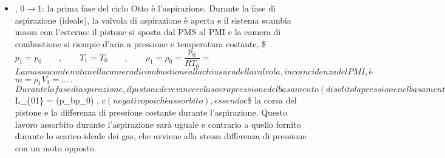 \documentclass[letterpaper,10pt,italian]{jupyterBook}
\begin{document}
\begin{itemize}
\item {} 
\sphinxAtStartPar
{}, \(0 \rightarrow 1\): la prima fase del ciclo Otto è
l’aspirazione. Durante la fase di aspirazione (ideale), la valvola
di aspirazione è aperta e il sistema scambia massa con l’esterno: il
pistone si sposta dal PMS al PMI e la camera di combustione si
riempie d’aria a pressione e temperatura costante,
\$\(p_1 = p_0 \qquad , \qquad
 T_1 = T_0 \qquad , \qquad
 \rho_1 = \rho_0 = \dfrac{p_0}{R T_0} =\)\( La massa contenuta nella
camera di combustione alla chiusura della valvola, in coincidenza
del PMI, è \)\(m = \rho_1 V_1 = \dots \ .\)\( Durante la fase di
aspirazione, il pistone deve vincere la sovrapressione del basamento
(di solito la pressione nel basamento è superiore a quella aspirata
in camera di combustione). Dal PMS al PMI un pistone assorbe parte
della potenza fornita dagli altri pistoni. Il lavoro che assorbe è
\)L\_\{01\} = \sphinxhyphen{}(p\_b\sphinxhyphen{}p\_0) , c\( (negativo poichè assorbito), essendo \)c\$
la corsa del pistone e la differenza di pressione costante durante
l’aspirazione. Questo lavoro assorbito durante l’aspirazione sarà
uguale e contrario a quello fornito durante lo scarico ideale dei
gas, che avviene alla stessa differenza di pressione con un moto
opposto.


\end{itemize}
\end{document}

